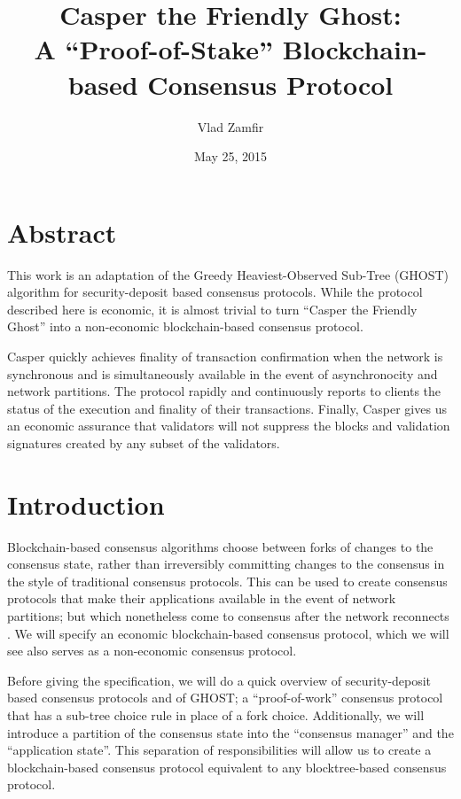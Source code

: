 \documentclass[11pt,a4paper]{article}
\title{Casper the Friendly Ghost: \\
		\vspace{2.5mm}
		\small A ``Proof-of-Stake'' Blockchain-based Consensus Protocol}
\date{May 25, 2015}
\author{Vlad Zamfir}
\begin{document}
\maketitle

\tableofcontents

\pagebreak

\section{Abstract}

This work is an adaptation of the Greedy Heaviest-Observed Sub-Tree\cite{GHOST} (GHOST) algorithm for security-deposit based consensus protocols. While the protocol described here is economic, it is almost trivial to turn ``Casper the Friendly Ghost'' into a non-economic blockchain-based consensus protocol. 

Casper quickly achieves finality of transaction confirmation when the network is synchronous and is simultaneously available in the event of asynchronocity and network partitions. The protocol rapidly and continuously reports to clients the status of the execution and finality of their transactions. Finally, Casper gives us an economic assurance that validators will not suppress the blocks and validation signatures created by any subset of the validators.


\section{Introduction}

Blockchain-based consensus algorithms choose between forks of changes to the consensus state, rather than irreversibly committing changes to the consensus in the style of traditional consensus protocols. This can be used to create consensus protocols that make their applications available in the event of network partitions; but which nonetheless come to consensus after the network reconnects \cite{ReformalizingConsensus}. We will specify an economic blockchain-based consensus protocol, which we will see also serves as a non-economic consensus protocol.

Before giving the specification, we will do a quick overview of security-deposit based consensus protocols and of GHOST; a ``proof-of-work'' consensus protocol that has a sub-tree choice rule in place of a fork choice. Additionally, we will introduce a partition of the consensus state into the ``consensus manager'' and the ``application state''. This separation of responsibilities will allow us to create a blockchain-based consensus protocol equivalent to any blocktree-based consensus protocol.
\end{document}
